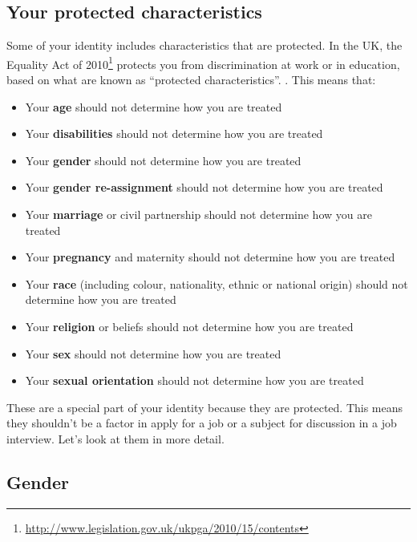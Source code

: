 \documentclass[
]{book}
\providecommand{\tightlist}{%
  \setlength{\itemsep}{0pt}\setlength{\parskip}{0pt}}
\begin{document}
\hypertarget{protected}{%
\subsection{Your protected characteristics}\label{protected}}

Some of your identity includes characteristics that are protected. In the UK, the Equality Act of 2010\footnote{\url{http://www.legislation.gov.uk/ukpga/2010/15/contents}} protects you from discrimination at work or in education, based on what are known as ``protected characteristics''. \citep{equality}. This means that:

\begin{itemize}
\tightlist
\item
  Your \textbf{age} should not determine how you are treated
\item
  Your \textbf{disabilities} should not determine how you are treated
\item
  Your \textbf{gender} should not determine how you are treated \citep{inferior, damore, damoreguardian, everydaysexism}
\item
  Your \textbf{gender re-assignment} should not determine how you are treated
\item
  Your \textbf{marriage} or civil partnership should not determine how you are treated
\item
  Your \textbf{pregnancy} and maternity should not determine how you are treated
\item
  Your \textbf{race} (including colour, nationality, ethnic or national origin) should not determine how you are treated \citep{nottalking, superior}
\item
  Your \textbf{religion} or beliefs should not determine how you are treated
\item
  Your \textbf{sex} should not determine how you are treated \citep{harassment}
\item
  Your \textbf{sexual orientation} should not determine how you are treated \citep{nosex}
\end{itemize}

These are a special part of your identity because they are protected. This means they shouldn't be a factor in apply for a job or a subject for discussion in a job interview. Let's look at them in more detail.

\hypertarget{genderid}{%
\subsection{Gender}\label{genderid}}
\end{document}
